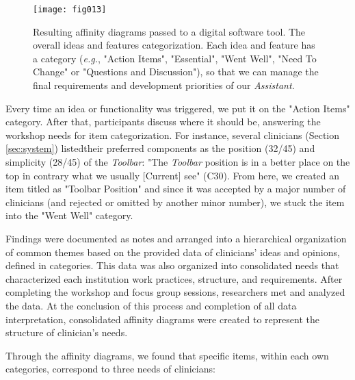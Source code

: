 \begin{figure}[ht]
\centering
\texttt{[image: fig013]}
\caption{Resulting affinity diagrams passed to a digital software tool. The overall ideas and features categorization. Each idea and feature has a category ({\it e.g.}, "Action Items", "Essential", "Went Well", "Need To Change" or "Questions and Discussion"), so that we can manage the final requirements and development priorities of our {\it Assistant}.}
\label{fig:fig013}
\end{figure}

Every time an idea or functionality was triggered, we put it on the "Action Items" category.
After that, participants discuss where it should be, answering the workshop needs for item categorization.
For instance, several clinicians (Section \ref{sec:system}) listed\footnotemark[17] their preferred components as the position (32/45) and simplicity (28/45) of the {\it Toolbar}:
"The {\it Toolbar} position is in a better place on the top in contrary what we usually [Current] see" (C30).
From here, we created an item titled as "Toolbar Position" and since it was accepted by a major number of clinicians (and rejected or omitted by another minor number), we stuck the item into the "Went Well" category.


Findings were documented as notes and arranged into a hierarchical organization of common themes based on the provided data of clinicians' ideas and opinions, defined in categories.
This data was also organized into consolidated needs that characterized each institution work practices, structure, and requirements.
After completing the workshop and focus group sessions, researchers met and analyzed the data.
At the conclusion of this process and completion of all data interpretation, consolidated affinity diagrams were created to represent the structure of clinician's needs.

\hfill

\noindent
Through the affinity diagrams, we found that specific items, within each own categories, correspond to three needs of clinicians:

